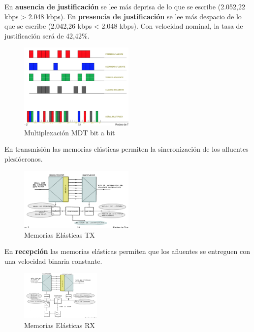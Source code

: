 \documentclass[10pt,portrait, twocolumn]{article}
\begin{document}
En \textbf{ausencia de justificación} se lee más deprisa de lo que se escribe (2.052,22 kbps > 2.048 kbps). En \textbf{presencia de justificación} se lee más despacio de lo que se escribe (2.042,26 kbps < 2.048 kbps). Con velocidad nominal, la tasa de justificación será de 42,42\%.

\begin{figure}[!ht]
	\centering
     \includegraphics[width=0.5\textwidth]{MDT}
      \caption{Multiplexación MDT bit a bit}
      \label{fig:Regiones de frecuencias}
  \end{figure}
  
En transmisión las memorias elásticas permiten la sincronización de los afluentes plesiócronos.
  
\begin{figure}[!ht]
	\centering
     \includegraphics[width=0.5\textwidth]{Elastica}
      \caption{Memorias Elásticas TX}
      \label{fig:Regiones de frecuencias}
  \end{figure}

En \textbf{recepción} las memorias elásticas permiten que los afluentes se entreguen con una velocidad binaria constante.

\begin{figure}[!ht]
	\centering
     \includegraphics[width=0.35\textwidth]{Elastica2}
      \caption{Memorias Elásticas RX}
      \label{fig:Regiones de frecuencias}
  \end{figure}
  
\end{document}
